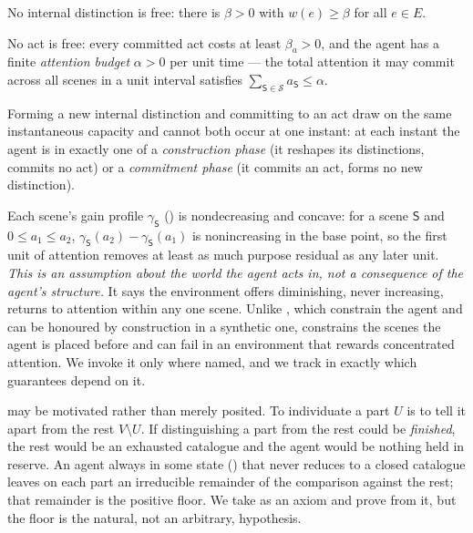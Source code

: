 \documentclass[11pt,twocolumn,a4paper]{article}
\newcommand{\V}{V}
\newcommand{\E}{E}
\newcommand{\wt}{w}
\newcommand{\floorc}{\beta}          %
\newcommand{\att}{\alpha}            %
\newcommand{\Scene}{\mathsf{S}}      %
\newcommand{\scenes}{\mathcal{S}}    %
\begin{document}
\begin{axiom}
\label{ax:costly}
No internal distinction is free: there is $\floorc>0$ with
$\wt(e)\ge\floorc$ for all $e\in\E$.
\end{axiom}

\begin{axiom}
\label{ax:actfloor}
No act is free: every committed act costs at least $\floorc_a>0$, and the
agent has a finite \emph{attention budget} $\att>0$ per unit time --- the
total attention it may commit across all scenes in a unit interval
satisfies $\sum_{\Scene\in\scenes}a_\Scene\le\att$.
\end{axiom}

\begin{axiom}
\label{ax:exclusion}
Forming a new internal distinction and committing to an act draw on the
same instantaneous capacity and cannot both occur at one instant: at each
instant the agent is in exactly one of a \emph{construction phase} (it
reshapes its distinctions, commits no act) or a \emph{commitment phase}
(it commits an act, forms no new distinction).
\end{axiom}

\begin{axiom}
\label{ax:concave}
Each scene's gain profile $\gamma_\Scene$ () is
nondecreasing and concave: for a scene $\Scene$ and $0\le a_1\le a_2$,
$\gamma_\Scene(a_2)-\gamma_\Scene(a_1)$ is nonincreasing in the base point,
so the first unit of attention removes at least as much purpose residual as
any later unit. \emph{This is an assumption about the world the agent acts
in, not a consequence of the agent's structure.} It says the environment
offers diminishing, never increasing, returns to attention within any one
scene. Unlike ,
which constrain the agent and can be honoured by construction in a
synthetic one,  constrains the scenes the agent is placed
before and can fail in an environment that rewards concentrated attention.
We invoke it only where named, and we track in  exactly
which guarantees depend on it.
\end{axiom}

\begin{remark}
\label{rem:costly-earned}
 may be motivated rather than merely posited. To
individuate a part $U$ is to tell it apart from the rest $\V\setminus U$.
If distinguishing a part from the rest could be \emph{finished}, the rest
would be an exhausted catalogue and the agent would be nothing held in
reserve. An agent always in some state () that never
reduces to a closed catalogue leaves on each part an irreducible remainder
of the comparison against the rest; that remainder is the positive floor.
We take  as an axiom and prove from it, but the floor is
the natural, not an arbitrary, hypothesis.
\end{remark}
\end{document}
